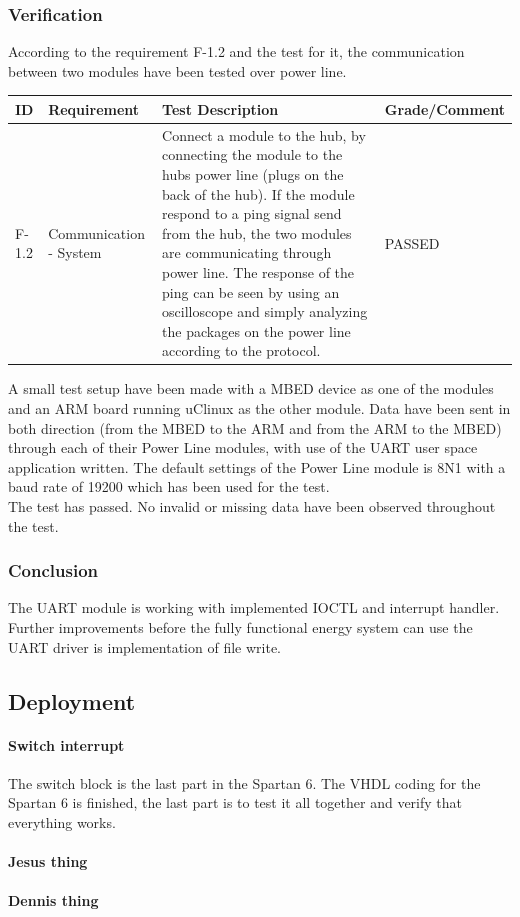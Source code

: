 \subsubsection{Verification}
According to the requirement F-1.2 and the test for it, the communication between two modules have been tested over power line. 
\begin{table}[H]
\centering
	\begin{tabular}{|p{1.2cm}|p{2.3cm}|p{9.5cm}|p{2.5cm}|}
	\hline
	ID		& Requirement		& Test Description		& Grade/Comment\\\hline
	F-1.2		& Communication - System & Connect a module to the hub, by connecting the module to the hubs power line (plugs on the back of the hub). If the module respond to a ping signal send from the hub, the two modules are communicating through power line. The response of the ping can be seen by using an oscilloscope and simply analyzing the packages on the power line according to the protocol. & PASSED\\\hline
	\end{tabular}
\end{table}
A small test setup have been made with a MBED device as one of the modules and an ARM board running uClinux as the other module. Data have been sent in both direction (from the MBED to the ARM and from the ARM to the MBED) through each of their Power Line modules, with use of the UART user space application written. The default settings of the Power Line module is 8N1 with a baud rate of 19200 which has been used for the test. 
\\ The test has passed. No invalid or missing data have been observed throughout the test. 
%
\subsubsection{Conclusion}
The UART module is working with implemented IOCTL and interrupt handler.
Further improvements before the fully functional energy system can use the UART driver is implementation of file write.
\subsection{Deployment}
\paragraph{Switch interrupt}
The switch block is the last part in the Spartan 6. The VHDL coding for the Spartan 6 is finished, the last part is to test it all together and verify that everything works.
%
%
\paragraph{Jesus thing}
%
%
\paragraph{Dennis thing}
%
%